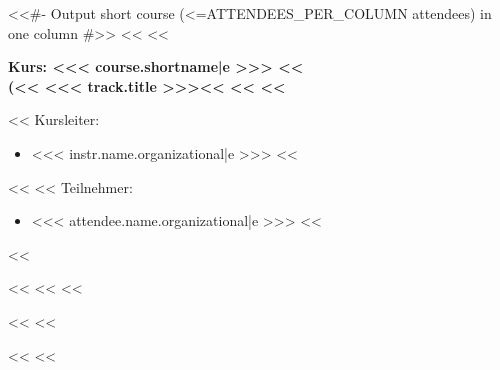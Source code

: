             <<#- Output short course (<=ATTENDEES_PER_COLUMN attendees) in one column #>>
            <<%
                <<%
                \begin{minipage}[t]{0.5\textwidth}
                    {\headingfamily\bfseries
                        Kurs: <<< course.shortname|e >>>
                        <<%
                            \\\mdseries
                            (<<%
                                <<< track.title >>><<%
                             <<%
                        <<%
                        \vspace{0.6\baselineskip}
                    }

                    <<%
                        Kursleiter:
                        \begin{itemize}
                            <<%
                                \item <<< instr.name.organizational|e >>>
                            <<%
                        \end{itemize}
                    <<%
                    <<%
                        Teilnehmer:
                        \begin{itemize}
                        <<%
                            \item <<< attendee.name.organizational|e >>>
                        <<%
                        \end{itemize}
                    <<%
                \end{minipage}%
            <<%
            <<%
                <<%


                \pagebreak
            <<%
        <<%


        \pagebreak
    <<%
<<%
